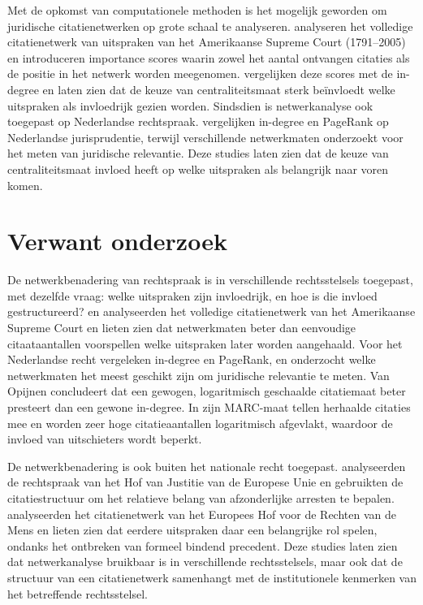 \documentclass[a4paper, 12pt]{report}
\begin{document}
Met de opkomst van computationele methoden is het mogelijk geworden om juridische citatienetwerken op grote schaal te analyseren. \textcite{fowler2007} analyseren het volledige citatienetwerk van uitspraken van het Amerikaanse Supreme Court (1791--2005) en introduceren importance scores waarin zowel het aantal ontvangen citaties als de positie in het netwerk worden meegenomen. \textcite{fowler2008} vergelijken deze scores met de in-degree en laten zien dat de keuze van centraliteitsmaat sterk beïnvloedt welke uitspraken als invloedrijk gezien worden. Sindsdien is netwerkanalyse ook toegepast op Nederlandse rechtspraak. \textcite{winkels2012} vergelijken in-degree en PageRank op Nederlandse jurisprudentie, terwijl \textcite{vanopijnen2012} verschillende netwerkmaten onderzoekt voor het meten van juridische relevantie. Deze studies laten zien dat de keuze van centraliteitsmaat invloed heeft op welke uitspraken als belangrijk naar voren komen.

\section{Verwant onderzoek}
De netwerkbenadering van rechtspraak is in verschillende rechtsstelsels toegepast, met dezelfde vraag: welke uitspraken zijn invloedrijk, en hoe is die invloed gestructureerd? \textcite{fowler2007} en \textcite{fowler2008} analyseerden het volledige citatienetwerk van het Amerikaanse Supreme Court en lieten zien dat netwerkmaten beter dan eenvoudige citaataantallen voorspellen welke uitspraken later worden aangehaald. Voor het Nederlandse recht vergeleken \textcite{winkels2012} in-degree en PageRank, en onderzocht \textcite{vanopijnen2012} welke netwerkmaten het meest geschikt zijn om juridische relevantie te meten. Van Opijnen concludeert dat een gewogen, logaritmisch geschaalde citatiemaat beter presteert dan een gewone in-degree. In zijn MARC-maat tellen herhaalde citaties mee en worden zeer hoge citatieaantallen logaritmisch afgevlakt, waardoor de invloed van uitschieters wordt beperkt.

De netwerkbenadering is ook buiten het nationale recht toegepast. \textcite{derlen2014} analyseerden de rechtspraak van het Hof van Justitie van de Europese Unie en gebruikten de citatiestructuur om het relatieve belang van afzonderlijke arresten te bepalen. \textcite{lupu2012} analyseerden het citatienetwerk van het Europees Hof voor de Rechten van de Mens en lieten zien dat eerdere uitspraken daar een belangrijke rol spelen, ondanks het ontbreken van formeel bindend precedent. Deze studies laten zien dat netwerkanalyse bruikbaar is in verschillende rechtsstelsels, maar ook dat de structuur van een citatienetwerk samenhangt met de institutionele kenmerken van het betreffende rechtsstelsel.
\end{document}
